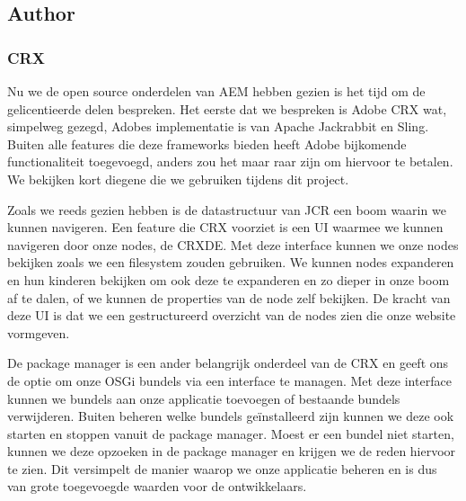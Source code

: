 \documentclass{article}
\begin{document}
	\subsection{Author}
	\subsubsection{CRX}
	Nu we de open source onderdelen van AEM hebben gezien is het tijd om de gelicentieerde delen bespreken. Het eerste dat we bespreken is Adobe CRX wat, simpelweg gezegd, Adobes implementatie is van Apache Jackrabbit en Sling. Buiten alle features die deze frameworks bieden heeft Adobe bijkomende functionaliteit toegevoegd, anders zou het maar raar zijn om hiervoor te betalen. We bekijken kort diegene die we gebruiken tijdens dit project.
	\par
	Zoals we reeds gezien hebben is de datastructuur van JCR een boom waarin we kunnen navigeren. Een feature die CRX voorziet is een UI waarmee we kunnen navigeren door onze nodes, de CRXDE. Met deze interface kunnen we onze nodes bekijken zoals we een filesystem zouden gebruiken. We kunnen nodes expanderen en hun kinderen bekijken om ook deze te expanderen en zo dieper in onze boom af te dalen, of we kunnen de properties van de node zelf bekijken. De kracht van deze UI is dat we een gestructureerd overzicht van de nodes zien die onze website vormgeven.
	\par
	De package manager is een ander belangrijk onderdeel van de CRX en geeft ons de optie om onze OSGi bundels via een interface te managen. Met deze interface kunnen we bundels aan onze applicatie toevoegen of bestaande bundels verwijderen. Buiten beheren welke bundels geïnstalleerd zijn kunnen we deze ook starten en stoppen vanuit de package manager. Moest er een bundel niet starten, kunnen we deze opzoeken in de package manager en krijgen we de reden hiervoor te zien. Dit versimpelt de manier waarop we onze applicatie beheren en is dus van grote toegevoegde waarden voor de ontwikkelaars.
\end{document}
